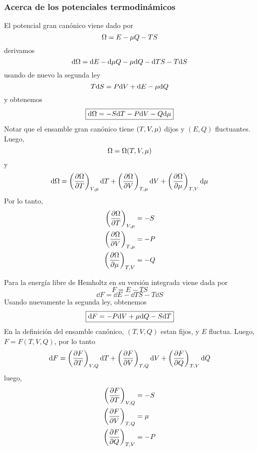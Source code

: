 \subsubsection{Acerca de los potenciales termodinámicos}
El potencial gran canónico viene dado por
\begin{equation}
  \Omega=E-\mu Q-TS
\end{equation}
derivamos
\begin{equation}
  \dd\Omega=\dd E-\dd\mu Q-\mu \dd Q-\dd TS-T\dd S
\end{equation}
usando de nuevo la segunda ley
\begin{equation}
  T\dd S=P\dd V+\dd E-\mu\dd Q
\end{equation}
y obtenemos
\begin{equation}
 \boxed{ \dd \Omega=-S\dd T-P\dd V-Q\dd\mu}
\end{equation}
Notar que el ensamble gran canónico tiene $(T,V,\mu )$ dijos y $(E,Q)$ fluctuantes. Luego,
\begin{equation}
  \Omega=\Omega(T,V,\mu )
\end{equation}
y
\begin{equation}
  \dd\Omega=\left(\pdv{\Omega}{T}\right)_{V,\mu }\dd T+\left(\pdv{\Omega}{V}\right)_{T,\mu }\dd V+\left(\pdv{\Omega}{\mu}\right)_{T,V }\dd \mu 
\end{equation}
Por lo tanto,
\begin{align}
  \left(\pdv{\Omega}{T}\right)_{V,\mu }&=-S\\
  \left(\pdv{\Omega}{V}\right)_{T,\mu }&=-P\\
  \left(\pdv{\Omega}{\mu}\right)_{T,V }&=-Q
\end{align}

Para la energía libre de Hemholtz en su versión integrada viene dada por
\begin{equation}
  F=E-TS
\end{equation}
\begin{equation}
  \dd F=\dd E-\dd TS-T\dd S
\end{equation}
Usando nuevamente la segunda ley, obtenemos
\begin{equation}
  \boxed{\dd F=-P\dd V+\mu \dd Q-S\dd T}
\end{equation}
En la definición del ensamble canónico, $(T,V,Q)$ estan fijos, y $E$ fluctua. Luego, $F=F(T,V,Q)$, por lo tanto
\begin{equation}
  \dd F=\left(\pdv{F}{T}\right)_{V,Q}\dd T+\left(\pdv{F}{V}\right)_{T,Q}\dd V+\left(\pdv{F}{Q}\right)_{T,V}\dd Q
\end{equation}
luego,
\begin{align}
  \left(\pdv{F}{T}\right)_{V,Q}&=-S\\
  \left(\pdv{F}{V}\right)_{T,Q}&=\mu \\
  \left(\pdv{F}{Q}\right)_{T,V}&=-P
\end{align}

